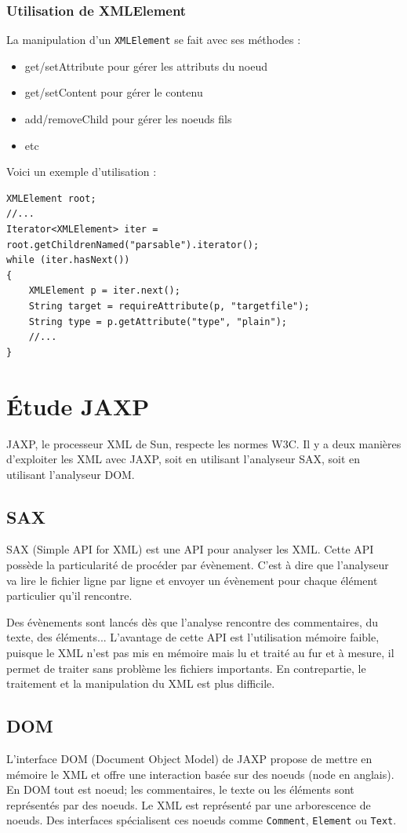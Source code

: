 \subsubsection{Utilisation de XMLElement}
La manipulation d'un \verb|XMLElement| se fait avec ses méthodes :
\begin{itemize}
	\item get/setAttribute pour gérer les attributs du noeud
	\item get/setContent pour gérer le contenu
	\item add/removeChild pour gérer les noeuds fils
	\item etc
\end{itemize}
Voici un exemple d'utilisation :
\begin{lstlisting}
XMLElement root;
//...
Iterator<XMLElement> iter = root.getChildrenNamed("parsable").iterator();
while (iter.hasNext())
{
	XMLElement p = iter.next();
	String target = requireAttribute(p, "targetfile");
	String type = p.getAttribute("type", "plain");
	//...
}
\end{lstlisting}
\section{Étude JAXP}
JAXP, le processeur XML de Sun, respecte les normes W3C.
Il y a deux manières d'exploiter les XML avec JAXP, soit en utilisant l'analyseur SAX, soit en utilisant l'analyseur DOM.
\subsection{SAX}
SAX (Simple API for XML) est une API pour analyser les XML.
Cette API possède la particularité de procéder par évènement.
C'est à dire que l'analyseur va lire le fichier ligne par ligne et envoyer un évènement pour chaque élément particulier qu'il rencontre.

Des évènements sont lancés dès que l'analyse rencontre des commentaires, du texte, des éléments...
L'avantage de cette API est l'utilisation mémoire faible, puisque le XML n'est pas mis en mémoire mais lu et traité au fur et à mesure, il permet de traiter sans problème les fichiers importants.
En contrepartie, le traitement et la manipulation du XML est plus difficile.
\subsection{DOM}
L'interface DOM (Document Object Model) de JAXP propose de mettre en mémoire le XML et offre une interaction basée sur des noeuds (node en anglais).
En DOM tout est noeud; les commentaires, le texte ou les éléments sont représentés par des noeuds.
Le XML est représenté par une arborescence de noeuds.
Des interfaces spécialisent ces noeuds comme \verb|Comment|, \verb|Element| ou \verb|Text|.

